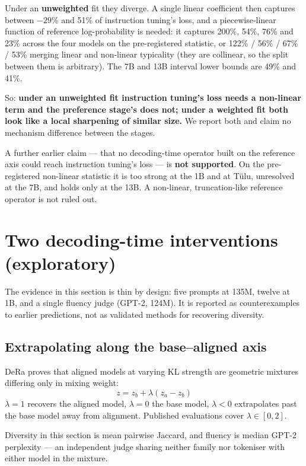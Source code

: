 \documentclass[11pt]{article}
\begin{document}
Under an \textbf{unweighted} fit they diverge. A single linear coefficient then
captures between $-29\%$ and 51\% of instruction tuning's loss, and a
piecewise-linear function of reference log-probability is needed: it captures
200\%, 54\%, 76\% and 23\% across the four models on the pre-registered statistic,
or 122\% / 56\% / 67\% / 53\% merging linear and non-linear typicality (they are
collinear, so the split between them is arbitrary). The 7B and 13B interval lower
bounds are 49\% and 41\%.

So: \textbf{under an unweighted fit instruction tuning's loss needs a non-linear
term and the preference stage's does not; under a weighted fit both look like a
local sharpening of similar size.} We report both and claim no mechanism difference
between the stages.

A further earlier claim --- that no decoding-time operator built on the reference
axis could reach instruction tuning's loss --- is \textbf{not supported}. On the
pre-registered non-linear statistic it is too strong at the 1B and at T\"ulu,
unresolved at the 7B, and holds only at the 13B. A non-linear, truncation-like
reference operator is not ruled out.

\section{Two decoding-time interventions (exploratory)}
\label{sec:decode}

The evidence in this section is thin by design: five prompts at 135M, twelve at
1B, and a single fluency judge (GPT-2, 124M). It is reported as counterexamples to
earlier predictions, not as validated methods for recovering diversity.

\subsection{Extrapolating along the base--aligned axis}
\label{sec:lambda}

DeRa \cite{liu2024dera} proves that aligned models at varying KL strength are
geometric mixtures differing only in mixing weight:
\[
z = z_b + \lambda (z_a - z_b)
\]
$\lambda = 1$ recovers the aligned model, $\lambda = 0$ the base model,
$\lambda < 0$ extrapolates past the base model away from alignment. Published
evaluations cover $\lambda \in [0, 2]$.

Diversity in this section is mean pairwise Jaccard, and fluency is median GPT-2
perplexity --- an independent judge sharing neither family nor tokeniser with
either model in the mixture.
\end{document}
